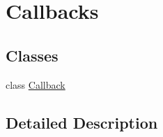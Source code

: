 \hypertarget{group__gr__callback}{}\section{Callbacks}
\label{group__gr__callback}
\subsection*{Classes}
\begin{DoxyCompactItemize}
\item 
class \hyperlink{class_callback}{Callback}
\end{DoxyCompactItemize}


\subsection{Detailed Description}
